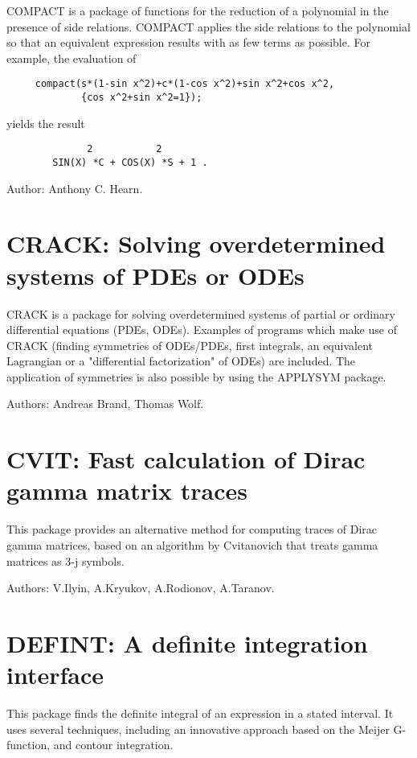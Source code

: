 COMPACT is a package of functions for the reduction of a polynomial in the
presence of side relations.  COMPACT applies the side relations to the
polynomial so that an equivalent expression results with as few terms as
possible.  For example, the evaluation of
\begin{verbatim}
     compact(s*(1-sin x^2)+c*(1-cos x^2)+sin x^2+cos x^2,
             {cos x^2+sin x^2=1});
\end{verbatim}
yields the result\pagebreak[1]
\begin{samepage}
\begin{verbatim}
              2           2
        SIN(X) *C + COS(X) *S + 1 .
\end{verbatim}

Author:  Anthony C. Hearn.
\end{samepage}

\section{CRACK: Solving overdetermined systems of PDEs or ODEs}

CRACK is a package for solving overdetermined systems of partial or
ordinary differential equations (PDEs, ODEs).  Examples of programs which
make use of CRACK (finding symmetries of ODEs/PDEs, first integrals, an
equivalent Lagrangian or a "differential factorization" of ODEs) are
included.  The application of symmetries is also possible by using the
APPLYSYM package.

Authors: Andreas Brand, Thomas Wolf.

\section{CVIT: Fast calculation of Dirac gamma matrix traces}
\label{CVIT}

This package provides an alternative method for computing traces of Dirac
gamma matrices, based on an algorithm by Cvitanovich that treats gamma
matrices as 3-j symbols.

Authors: V.Ilyin, A.Kryukov, A.Rodionov, A.Taranov.

\section{DEFINT: A definite integration interface}
\label{DEFINT}

This package finds the definite integral of an expression in a stated
interval.  It uses several techniques, including an innovative approach
based on the Meijer G-function, and contour integration.

